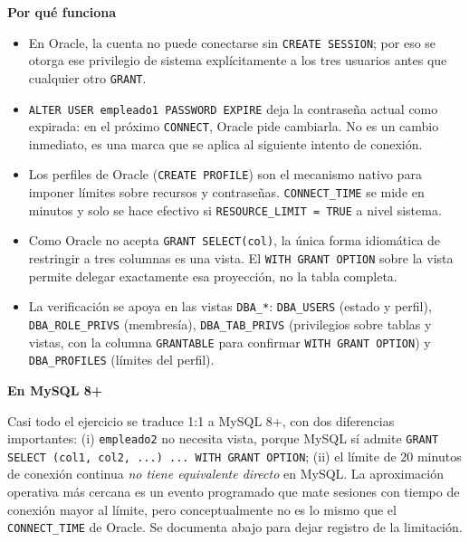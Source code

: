 \documentclass[11pt,a4paper]{article}
\newcommand{\itemcabecera}[1]{\noindent\textbf{#1}\par\medskip}
\newcommand{\bloquePorque}{\itemcabecera{Por qu\'e funciona}}
\newcommand{\bloqueMySQL}{\itemcabecera{En MySQL 8+}}
\begin{document}
\bloquePorque

\begin{itemize}
    \item En Oracle, la cuenta no puede conectarse sin \texttt{CREATE SESSION}; por eso se otorga ese privilegio de sistema explícitamente a los tres usuarios antes que cualquier otro \texttt{GRANT}.
    \item \texttt{ALTER USER empleado1 PASSWORD EXPIRE} deja la contraseña actual como expirada: en el próximo \texttt{CONNECT}, Oracle pide cambiarla. No es un cambio inmediato, es una marca que se aplica al siguiente intento de conexión.
    \item Los perfiles de Oracle (\texttt{CREATE PROFILE}) son el mecanismo nativo para imponer límites sobre recursos y contraseñas. \texttt{CONNECT\_TIME} se mide en minutos y solo se hace efectivo si \texttt{RESOURCE\_LIMIT = TRUE} a nivel sistema.
    \item Como Oracle no acepta \texttt{GRANT SELECT(col)}, la única forma idiomática de restringir a tres columnas es una vista. El \texttt{WITH GRANT OPTION} sobre la vista permite delegar exactamente esa proyección, no la tabla completa.
    \item La verificación se apoya en las vistas \texttt{DBA\_*}: \texttt{DBA\_USERS} (estado y perfil), \texttt{DBA\_ROLE\_PRIVS} (membresía), \texttt{DBA\_TAB\_PRIVS} (privilegios sobre tablas y vistas, con la columna \texttt{GRANTABLE} para confirmar \texttt{WITH GRANT OPTION}) y \texttt{DBA\_PROFILES} (límites del perfil).
\end{itemize}

\bloqueMySQL

Casi todo el ejercicio se traduce 1:1 a MySQL 8+, con dos diferencias importantes: (i) \texttt{empleado2} no necesita vista, porque MySQL sí admite \texttt{GRANT SELECT (col1, col2, ...) ... WITH GRANT OPTION}; (ii) el límite de 20 minutos de conexión continua \emph{no tiene equivalente directo} en MySQL. La aproximación operativa más cercana es un evento programado que mate sesiones con tiempo de conexión mayor al límite, pero conceptualmente no es lo mismo que el \texttt{CONNECT\_TIME} de Oracle. Se documenta abajo para dejar registro de la limitación.
\end{document}
